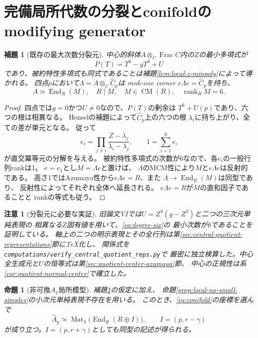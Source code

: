 \documentclass[11pt,a4paper]{ltjsarticle}
\newtheorem{lemma}[theorem]{補題}
\newtheorem{proposition}[theorem]{命題}
\newtheorem{remark}[theorem]{注意}
\newcommand{\End}{\operatorname{End}}
\newcommand{\Mat}{\operatorname{Mat}}
\newcommand{\Frac}{\operatorname{Frac}}
\newcommand{\CM}{\operatorname{CM}}
\begin{document}
\section{完備局所代数の分裂とconifoldのmodifying generator}
\begin{lemma}[既存の最大次数分裂元]\label{lem:splitting}
中心的斜体$A\otimes_C\Frac C$内の$Z$の最小多項式が
\begin{equation}\label{eq:degree-six}
 P(T)=T^6-gT^3+U
\end{equation}
であり、被約特性多項式も同式であることは補題\ref{lem:local-z-minpoly}によって導かれる。
四点$p$において$\Lambda=A\otimes_C\widehat C_p$は
rank-one corner $e\Lambda e=\widehat C_p$を持ち、
\[
 \Lambda\simeq\End_R(M),\quad
 R\mid M,\quad M\in\CM(R),\quad \operatorname{rank}_R M=6.
\]
\end{lemma}
\begin{proof}
四点では$g=0$かつ$U\ne0$なので、$P(T)$の剰余は
$T^6+U(p)$であり、六つの根は相異なる。
Henselの補題によって$\widehat C_p$上の六つの根
$\lambda_i$に持ち上がり、全ての差が単元となる。
従って
\[
 e_i=\prod_{j\ne i}\frac{Z-\lambda_j}{\lambda_i-\lambda_j},
 \qquad 1=\sum_{i=1}^6e_i
\]
が直交冪等元の分解を与える。
被約特性多項式の次数が6なので、各$e_i$の一般行列rankは1。
$e=e_1$とし$M=\Lambda e$と置けば、
$\Lambda$のMCM性により$M$と$e\Lambda e$は反射的である。
高さ1ではAzumaya性から$e\Lambda e=R$、また
$\Lambda\to\End_R(M)$は同型であり、
反射性によってそれぞれ全体へ延長される。
$e\Lambda e=R$が$M$の直和因子であることと
rankの等式も従う。
\end{proof}
\begin{remark}[分裂元に必要な実証]
旧論文VIでは$U=Z^3(g-Z^3)$と二つの三次元単純表現の
相異なる$Z$固有値を用いて、\eqref{eq:degree-six}の
最小次数が6であることを証明している。
軸上の二つの明示表現とその全行列は第\ref{sec:central-quotient-representations}節にTeX化し、
関係式を\texttt{computations/verify\_central\_quotient\_reps.py}で
厳密に独立検算した。中心全生成元と$U$の恒等式は第\ref{sec:quotient-center-azumaya}節、
中心の正規性は系\ref{cor:quotient-normal-center}で確立した。
\end{remark}
\begin{proposition}[非可換$A_1$局所模型]\label{prop:local-model}
補題\ref{lem:splitting}の仮定に加え、
命題\ref{prop:local-no-small-simples}の小次元単純表現不存在を用いる。
このとき、\eqref{eq:conifold}の座標を選んで
\begin{equation}\label{eq:endR}
 \widehat A_p\simeq\Mat_3\bigl(\End_R(R\oplus I)\bigr),
 \qquad I=(p,r-\gamma)
\end{equation}
が成り立つ。$I=(p,r+\gamma)$としても同型の記述が得られる。
\end{proposition}
\end{document}
